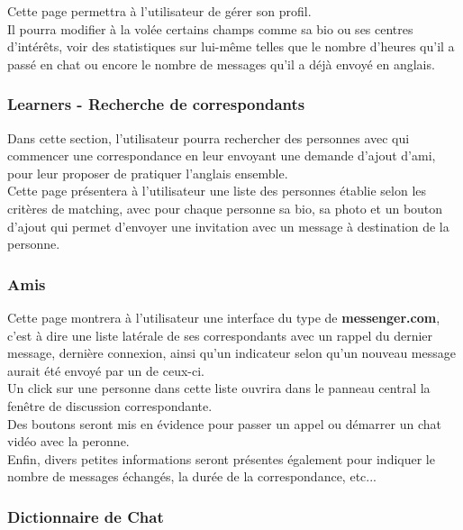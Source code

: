 \documentclass[a4paper,10pt,final,fleqn]{article}
\begin{document}
				Cette page permettra à l'utilisateur de gérer son profil.\\
				Il pourra modifier à la volée certains champs comme sa bio ou ses centres d'intérêts, voir des statistiques sur lui-même telles que le nombre d'heures qu'il a passé en chat ou encore le nombre de messages qu'il a déjà envoyé en anglais.\\

			\subsubsection{Learners - Recherche de correspondants}

				Dans cette section, l'utilisateur pourra rechercher des personnes avec qui commencer une correspondance en leur envoyant une demande d'ajout d'ami, pour leur proposer de pratiquer l'anglais ensemble.\\

				Cette page présentera à l'utilisateur une liste des personnes établie selon les critères de matching, avec pour chaque personne sa bio, sa photo et un bouton d'ajout qui permet d'envoyer une invitation avec un message à destination de la personne.\\


			\subsubsection{Amis}

				Cette page montrera à l'utilisateur une interface du type de \textbf{messenger.com}, c'est à dire une liste latérale de ses correspondants avec un rappel du dernier message, dernière connexion, ainsi qu'un indicateur selon qu'un nouveau message aurait été envoyé par un de ceux-ci.\\
				Un click sur une personne dans cette liste ouvrira dans le panneau central la fenêtre de discussion correspondante.\\
				Des boutons seront mis en évidence pour passer un appel ou démarrer un chat vidéo avec la peronne.\\
				Enfin, divers petites informations seront présentes également pour indiquer le nombre de messages échangés, la durée de la correspondance, etc...\\

			\subsubsection{Dictionnaire de Chat}
\end{document}
